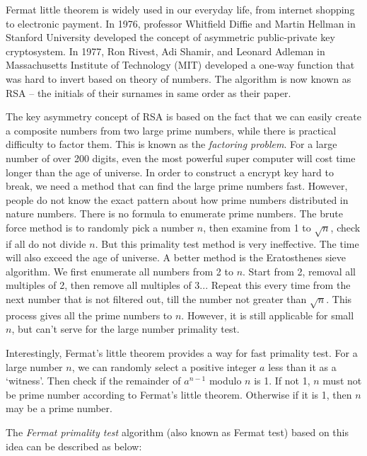 \documentclass{article}
\begin{document}
\vspace{5mm}


Fermat little theorem is widely used in our everyday life, from internet shopping to electronic payment. In 1976, professor Whitfield Diffie and Martin Hellman in Stanford University developed the concept of asymmetric public-private key cryptosystem. In 1977, Ron Rivest, Adi Shamir, and Leonard Adleman in Massachusetts Institute of Technology (MIT) developed a one-way function that was hard to invert based on theory of numbers. The algorithm is now known as RSA – the initials of their surnames in same order as their paper.

The key asymmetry concept of RSA is based on the fact that we can easily create a composite numbers from two large prime numbers, while there is practical difficulty to factor them. This is known as the {\em factoring problem}. For a large number of over 200 digits, even the most powerful super computer will cost time longer than the age of universe. In order to construct a encrypt key hard to break, we need a method that can find the large prime numbers fast. However, people do not know the exact pattern about how prime numbers distributed in nature numbers. There is no formula to enumerate prime numbers. The brute force method is to randomly pick a number $n$, then examine from 1 to $\sqrt{n}$, check if all do not divide $n$. But this primality test method is very ineffective. The time will also exceed the age of universe. A better method is the Eratosthenes sieve algorithm. We first enumerate all numbers from 2 to $n$. Start from 2, removal all multiples of 2, then remove all multiples of 3... Repeat this every time from the next number that is not filtered out, till the number not greater than $\sqrt{n}$. This process gives all the prime numbers to $n$. However, it is still applicable for small $n$, but can't serve for the large number primality test.

Interestingly, Fermat's little theorem provides a way for fast primality test. For a large number $n$, we can randomly select a positive integer $a$ less than it as a `witness'. Then check if the remainder of $a^{n-1}$ modulo $n$ is 1. If not 1, $n$ must not be prime number according to Fermat's little theorem. Otherwise if it is 1, then $n$ may be a prime number.

The {\em Fermat primality test} algorithm (also known as Fermat test) based on this idea can be described as below:
\end{document}
